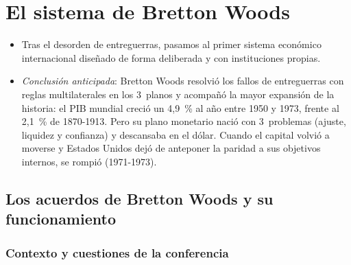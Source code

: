 \documentclass[11pt]{article}
\begin{document}
\section{El sistema de Bretton Woods}\label{sec:bretton}

\begin{itemize}
\item Tras el desorden de entreguerras, pasamos al primer sistema económico internacional diseñado de forma deliberada y con instituciones propias.
\item \emph{Conclusión anticipada}: Bretton Woods resolvió los fallos de entreguerras con reglas multilaterales en los 3~planos y acompañó la mayor expansión de la historia: el PIB mundial creció un 4,9~\% al año entre 1950 y 1973, frente al 2,1~\% de 1870-1913\nocite{Maddison2001World}. Pero su plano monetario nació con 3~problemas (ajuste, liquidez y confianza) y descansaba en el dólar. Cuando el capital volvió a moverse y Estados Unidos dejó de anteponer la paridad a sus objetivos internos, se rompió (1971-1973).
\end{itemize}

\subsection{Los acuerdos de Bretton Woods y su funcionamiento}\label{sec:acuerdos}

\subsubsection{Contexto y cuestiones de la conferencia}
\end{document}
